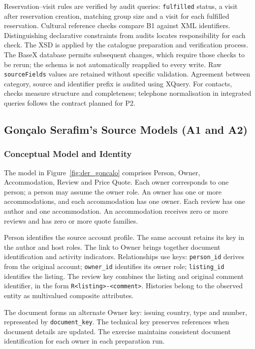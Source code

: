 Reservation--visit rules are verified by audit queries: \texttt{fulfilled} status, a visit after reservation creation, matching group size and a visit for each fulfilled reservation. Cultural reference checks compare B1 against XML identifiers. Distinguishing declarative constraints from audits locates responsibility for each check.
The XSD is applied by the catalogue preparation and verification process. The BaseX database permits subsequent changes, which require those checks to be rerun; the schema is not automatically reapplied to every write. Raw \texttt{sourceFields} values are retained without specific validation. Agreement between category, source and identifier prefix is audited using XQuery. For contacts, checks measure structure and completeness; telephone normalisation in integrated queries follows the contract planned for P2.
\subsection{Gonçalo Serafim's Source Models (A1 and A2)}\label{subsec:modelos_goncalo}
\subsubsection{Conceptual Model and Identity}
The model in Figure~\ref{fig:der_goncalo} comprises Person, Owner, Accommodation, Review and Price Quote. Each owner corresponds to one person; a person may assume the owner role. An owner has one or more accommodations, and each accommodation has one owner. Each review has one author and one accommodation. An accommodation receives zero or more reviews and has zero or more quote families.

Person identifies the source account profile. The same account retains its key in the author and host roles. The link to Owner brings together document identification and activity indicators. Relationships use keys: \texttt{person\_\allowbreak{}id} derives from the original account; \texttt{owner\_\allowbreak{}id} identifies its owner role; \texttt{listing\_\allowbreak{}id} identifies the listing. The review key combines the listing and original comment identifier, in the form \texttt{R<listing>-<comment>}. Histories belong to the observed entity as multivalued composite attributes.

The document forms an alternate Owner key: issuing country, type and number, represented by \texttt{document\_\allowbreak{}key}. The technical key preserves references when document details are updated. The exercise maintains consistent document identification for each owner in each preparation run.

